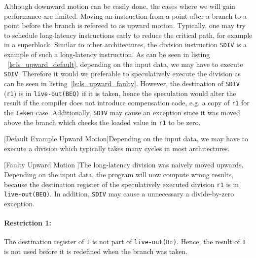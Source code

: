Although downward motion can be easily done, the cases where we will gain performance are limited. Moving an instruction from a point after a branch to a point before the branch is refereed to as upward motion. Typically, one may try to schedule long-latency instructions early to reduce the critical path, for example in a superblock. Similar to other architectures, the division instruction \texttt{SDIV} is a example of such a long-latency instruction. As can be seen in listing ~\ref{ls:ls_upward_default}, depending on the input data, we may have to execute \texttt{SDIV}. Therefore it would we preferable to speculatively execute the division as can be seen in listing~\ref{ls:ls_upward_faulty}. However, the destination of \texttt{SDIV} (\texttt{r1}) is in \texttt{live-out(BEQ)} if it is taken, hence the speculation would alter the result if the compiler does not introduce compensation code, e.g. a copy of \texttt{r1} for the \texttt{taken} case. Additionally, \texttt{SDIV} may cause an exception since it was moved above the branch which checks the loaded value in \texttt{r1} to be zero. 

\begin{center}
    \begin{minipage}{.45\textwidth}
        \centering
        
        \captionsetup{type=listing}
        [Default Example Upward Motion]{Depending on the input data, we may have to execute a division which typically takes many cycles in most architectures.}
        \label{ls:ls_upward_default}
    \end{minipage}\hfill
    \begin{minipage}{.45\textwidth}
        \centering
        
        \captionsetup{type=listing}
        [Faulty Upward Motion ]{The long-latency division was naively moved upwards. Depending on the input data, the program will now compute wrong results, because the destination register of the speculatively executed division \texttt{r1} is in \texttt{live-out(BEQ)}. In addition, \texttt{SDIV} may cause a unnecessary a divide-by-zero exception.}
        \label{ls:ls_upward_faulty}
    \end{minipage}
\end{center}

\paragraph{Restriction 1:} The destination register of \texttt{I} is not part of \texttt{live-out(Br)}. Hence, the result of \texttt{I} is not used before it is redefined when the branch was taken.
